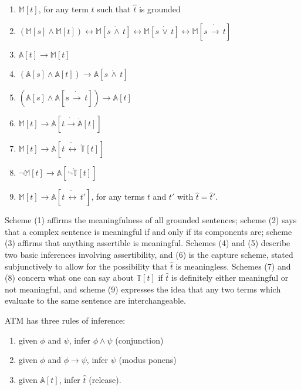 \documentclass{amsart}
\theoremstyle{definition}
\begin{document}
\begin{enumerate}
\item $\mathbb{M}[t]$, for any term $t$ such that $\hat{t}$ is grounded

\item $(\mathbb{M}[s] \wedge \mathbb{M}[t]) \leftrightarrow  \mathbb{M}[s \, \dot{\wedge}\, t] \leftrightarrow \mathbb{M}[s \, \dot{\vee}\, t]  \leftrightarrow \mathbb{M}[s\, \dot{\to}\, t]$

\item $\mathbb{A}[t] \to \mathbb{M}[t]$

\item $(\mathbb{A}[s] \wedge \mathbb{A}[t]) \to  \mathbb{A}[s\, \dot{\wedge}\, t]$

\item $(\mathbb{A}[s] \wedge \mathbb{A}[s \, \dot{\to}\, t]) \to \mathbb{A}[t]$

\item $\mathbb{M}[t] \to \mathbb{A}[t \dot{\to} \dot{\mathbb{A}}[t]]$

\item $\mathbb{M}[t] \to \mathbb{A}[t\, \dot{\leftrightarrow}\, \dot{\mathbb{T}}[t]]$

\item $\neg \mathbb{M}[t] \to \mathbb{A}[\dot{\neg}\dot{\mathbb{T}}[t]]$

\item $\mathbb{M}[t] \to \mathbb{A}[t\, \dot{\leftrightarrow}\, t']$, for any terms $t$ and $t'$ with $\hat{t} = \hat{t}'$.
\end{enumerate}

Scheme (1) affirms the meaningfulness of all grounded sentences; scheme (2) says that a complex sentence is meaningful if and only if its components are; scheme (3) affirms that anything assertible is meaningful. Schemes (4) and (5) describe two basic inferences involving assertibility, and (6) is the capture scheme, stated subjunctively to allow for the possibility that $\hat{t}$ is meaningless. Schemes (7) and (8) concern what one can say about $\mathbb{T}[t]$ if $\hat{t}$ is definitely either meaningful or not meaningful, and scheme (9) expresses the idea that any two terms which evaluate to the same sentence are interchangeable.

ATM has three rules of inference:

\begin{enumerate}
\item given $\phi$ and $\psi$, infer $\phi \wedge \psi$ (conjunction)

\item given $\phi$ and $\phi \to \psi$, infer $\psi$ (modus ponens)

\item given $\mathbb{A}[t]$, infer $\hat{t}$ (release).
\end{enumerate}
\end{document}
